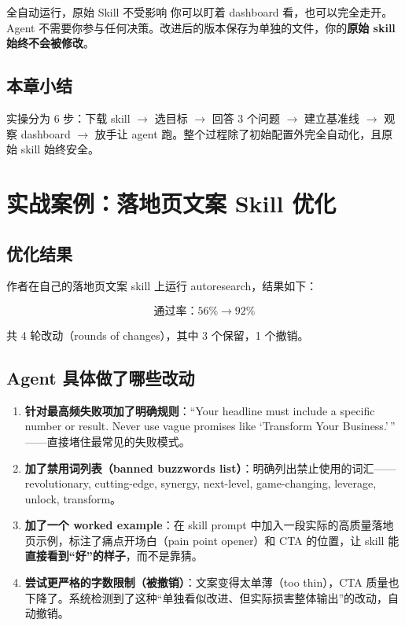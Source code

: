 \documentclass[a4paper]{article}
\begin{document}
\begin{importantbox}{全自动运行，原始 Skill 不受影响}
你可以盯着 dashboard 看，也可以完全走开。Agent 不需要你参与任何决策。改进后的版本保存为单独的文件，你的\textbf{原始 skill 始终不会被修改}。
\end{importantbox}

\subsection{本章小结}

实操分为 6 步：下载 skill $\to$ 选目标 $\to$ 回答 3 个问题 $\to$ 建立基准线 $\to$ 观察 dashboard $\to$ 放手让 agent 跑。整个过程除了初始配置外完全自动化，且原始 skill 始终安全。

\section{实战案例：落地页文案 Skill 优化}

\subsection{优化结果}

作者在自己的落地页文案 skill 上运行 autoresearch，结果如下：

$$\text{通过率：} 56\% \longrightarrow 92\%$$

共 4 轮改动（rounds of changes），其中 3 个保留，1 个撤销。

\subsection{Agent 具体做了哪些改动}

\begin{enumerate}
    \item \textbf{针对最高频失败项加了明确规则}：``Your headline must include a specific number or result. Never use vague promises like `Transform Your Business.'\,'' ——直接堵住最常见的失败模式。

    \item \textbf{加了禁用词列表（banned buzzwords list）}：明确列出禁止使用的词汇——revolutionary, cutting-edge, synergy, next-level, game-changing, leverage, unlock, transform。

    \item \textbf{加了一个 worked example}：在 skill prompt 中加入一段实际的高质量落地页示例，标注了痛点开场白（pain point opener）和 CTA 的位置，让 skill 能\textbf{直接看到``好''的样子}，而不是靠猜。

    \item \textbf{尝试更严格的字数限制（被撤销）}：文案变得太单薄（too thin），CTA 质量也下降了。系统检测到了这种``单独看似改进、但实际损害整体输出''的改动，自动撤销。
\end{enumerate}
\end{document}
